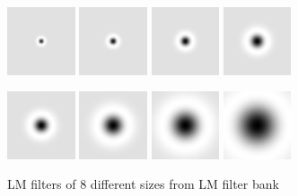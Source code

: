 \begin{figure}
\includegraphics[width=2.0cm]{figs/lmf1.png}
\includegraphics[width=2.0cm]{figs/lmf3.png}
\includegraphics[width=2.0cm]{figs/lmf5.png}
\includegraphics[width=2.0cm]{figs/lmf7.png}
\end{figure}
\begin{figure}
\includegraphics[width=2.0cm]{figs/lmf2.png}
\includegraphics[width=2.0cm]{figs/lmf4.png}
\includegraphics[width=2.0cm]{figs/lmf6.png}
\includegraphics[width=2.0cm]{figs/lmf8.png}
\caption{LM filters of 8 different sizes from LM filter bank}
\label{fig:log_filters8}
\end{figure}



